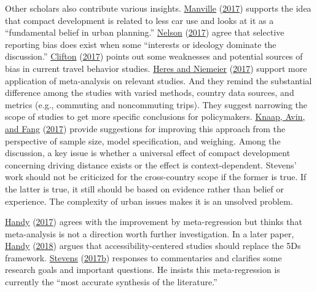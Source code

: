 \documentclass[
  12pt,
]{article}
\begin{document}
Other scholars also contribute various insights. \protect\hyperlink{ref-manvilleTravelBuiltEnvironment2017}{Manville} (\protect\hyperlink{ref-manvilleTravelBuiltEnvironment2017}{2017}) supports the idea that compact development is related to less car use and looks at it as a ``fundamental belief in urban planning.'' \protect\hyperlink{ref-nelsonCompactDevelopmentReduces2017}{Nelson} (\protect\hyperlink{ref-nelsonCompactDevelopmentReduces2017}{2017}) agree that selective reporting bias does exist when some ``interests or ideology dominate the discussion.'' \protect\hyperlink{ref-cliftonGettingHereThere2017}{Clifton} (\protect\hyperlink{ref-cliftonGettingHereThere2017}{2017}) points out some weaknesses and potential sources of bias in current travel behavior studies. \protect\hyperlink{ref-heresFutureResearchLink2017}{Heres and Niemeier} (\protect\hyperlink{ref-heresFutureResearchLink2017}{2017}) support more application of meta-analysis on relevant studies. And they remind the substantial difference among the studies with varied methods, country data sources, and metrics (e.g., commuting and noncommuting trips). They suggest narrowing the scope of studies to get more specific conclusions for policymakers. \protect\hyperlink{ref-knaapDrivingCompactGrowth2017}{Knaap, Avin, and Fang} (\protect\hyperlink{ref-knaapDrivingCompactGrowth2017}{2017}) provide suggestions for improving this approach from the perspective of sample size, model specification, and weighing. Among the discussion, a key issue is whether a universal effect of compact development concerning driving distance exists or the effect is context-dependent. Stevens' work should not be criticized for the cross-country scope if the former is true. If the latter is true, it still should be based on evidence rather than belief or experience. The complexity of urban issues makes it is an unsolved problem.

\protect\hyperlink{ref-handyThoughtsMeaningMark2017}{Handy} (\protect\hyperlink{ref-handyThoughtsMeaningMark2017}{2017}) agrees with the improvement by meta-regression but thinks that meta-analysis is not a direction worth further investigation. In a later paper, \protect\hyperlink{ref-handyEnoughAlreadyLet2018}{Handy} (\protect\hyperlink{ref-handyEnoughAlreadyLet2018}{2018}) argues that accessibility-centered studies should replace the 5Ds framework. \protect\hyperlink{ref-stevensResponseCommentariesDoes2017}{Stevens} (\protect\hyperlink{ref-stevensResponseCommentariesDoes2017}{2017b}) responses to commentaries and clarifies some research goals and important questions. He insists this meta-regression is currently the ``most accurate synthesis of the literature.''
\end{document}
